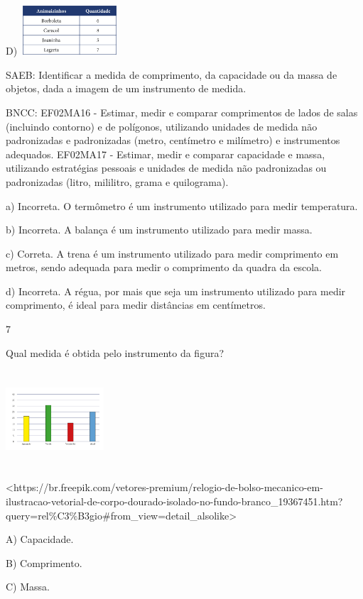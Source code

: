 \begin{escolha}
\begin{escolha}
{{{{D)
\includegraphics[width=1.44097in,height=0.72049in]{media/image135.png}

SAEB: Identificar a medida de comprimento, da capacidade ou da
massa de objetos, dada a imagem de um instrumento de medida.

BNCC: EF02MA16 - Estimar, medir e comparar comprimentos de lados de
salas (incluindo contorno) e de polígonos, utilizando unidades de medida
não padronizadas e padronizadas (metro, centímetro e milímetro) e
instrumentos adequados. EF02MA17 - Estimar, medir e comparar capacidade
e massa, utilizando estratégias pessoais e unidades de medida não
padronizadas ou padronizadas (litro, mililitro, grama e quilograma).

a) Incorreta. O termômetro é um instrumento utilizado para medir temperatura.

b) Incorreta. A balança é um instrumento utilizado para medir massa.

c) Correta. A trena é um instrumento utilizado para medir comprimento
em metros, sendo adequada para medir o comprimento da quadra da escola.

d) Incorreta. A régua, por mais que seja um instrumento utilizado para
medir comprimento, é ideal para medir distâncias em centímetros.

\num{7}

Qual medida é obtida pelo instrumento da figura?

\includegraphics[width=1.43850in,height=1.43251in]{media/image136.png}

\textless{}https://br.freepik.com/vetores-premium/relogio-de-bolso-mecanico-em-ilustracao-vetorial-de-corpo-dourado-isolado-no-fundo-branco\_19367451.htm?query=rel\%C3\%B3gio\#from\_view=detail\_alsolike\textgreater{}

A) Capacidade.

B) Comprimento.

C) Massa.

}}}}
\end{escolha}
\end{escolha}
